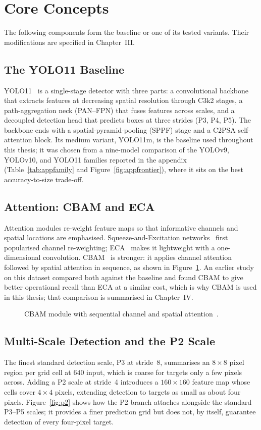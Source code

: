 \documentclass[12pt,a4paper,oneside]{report}
\begin{document}
\section{Core Concepts}
The following components form the baseline or one of its tested variants. Their
modifications are specified in Chapter~III.

\subsection{The YOLO11 Baseline}
YOLO11~\cite{jocher2024yolo11} is a single-stage detector with three parts: a
convolutional backbone that extracts features at decreasing spatial resolution
through C3k2 stages, a path-aggregation neck (PAN--FPN) that fuses features across
scales, and a decoupled detection head that predicts boxes at three strides (P3,
P4, P5). The backbone ends with a spatial-pyramid-pooling (SPPF) stage and a
C2PSA self-attention block. Its medium variant, YOLO11m, is the baseline used
throughout this thesis; it was chosen from a nine-model comparison of the
YOLOv9, YOLOv10, and YOLO11 families reported in the appendix
(Table~\ref{tab:appfamily} and Figure~\ref{fig:appfrontier}), where it sits on
the best accuracy-to-size trade-off.

\subsection{Attention: CBAM and ECA}
Attention modules re-weight feature maps so that informative channels and spatial
locations are emphasised. Squeeze-and-Excitation networks~\cite{hu2018senet} first
popularised channel re-weighting; ECA~\cite{wang2020eca} makes it lightweight with a
one-dimensional convolution. CBAM~\cite{woo2018cbam} is stronger:
it applies channel attention followed by spatial attention in sequence, as shown in
Figure~\ref{fig:cbam}. An earlier study on this dataset compared both against the
baseline and found CBAM to give better operational recall than ECA at a similar
cost, which is why CBAM is used in this thesis; that comparison is summarised in
Chapter~IV.

\begin{figure}[tbp]
  \centering
  \caption{CBAM module with sequential channel and spatial attention~\cite{woo2018cbam}.}
  \label{fig:cbam}
\end{figure}

\subsection{Multi-Scale Detection and the P2 Scale}
The finest standard detection scale, P3 at stride~8, summarises an $8\times8$ pixel
region per grid cell at $640$ input, which is coarse for targets only a few pixels
across. Adding a P2 scale at stride~4 introduces a $160\times160$ feature map whose
cells cover $4\times4$ pixels, extending detection to targets as small as about
four pixels. Figure~\ref{fig:p2} shows how the P2 branch attaches alongside the
standard P3--P5 scales; it provides a finer prediction grid but does not, by
itself, guarantee detection of every four-pixel target.
\end{document}
